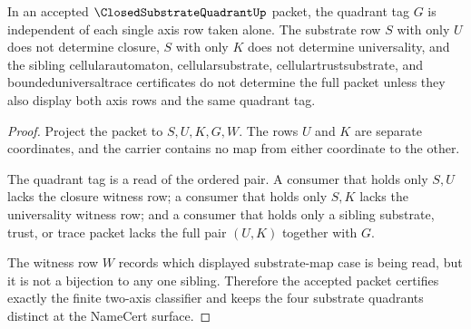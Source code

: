 \begin{theorem}
\label{thm:closed-substrate-quadrant-independence-certificate}
In an accepted $\ClosedSubstrateQuadrantUp$ packet, the quadrant tag $G$ is independent of each single axis row taken alone. The substrate row $S$ with only $U$ does not determine closure, $S$ with only $K$ does not determine universality, and the sibling cellularautomaton, cellularsubstrate, cellulartrustsubstrate, and boundeduniversaltrace certificates do not determine the full packet unless they also display both axis rows and the same quadrant tag.
\end{theorem}
\begin{proof}
Project the packet to $S,U,K,G,W$. The rows $U$ and $K$ are separate coordinates, and the carrier contains no map from either coordinate to the other.

The quadrant tag is a read of the ordered pair. A consumer that holds only $S,U$ lacks the closure witness row; a consumer that holds only $S,K$ lacks the universality witness row; and a consumer that holds only a sibling substrate, trust, or trace packet lacks the full pair $(U,K)$ together with $G$.

The witness row $W$ records which displayed substrate-map case is being read, but it is not a bijection to any one sibling. Therefore the accepted packet certifies exactly the finite two-axis classifier and keeps the four substrate quadrants distinct at the NameCert surface.
\end{proof}

